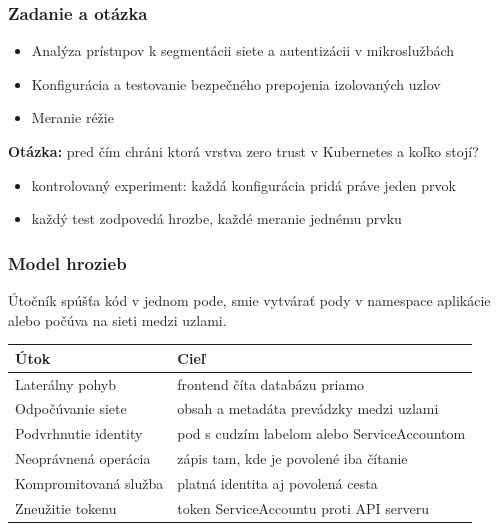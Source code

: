 \documentclass[%
  12pt,       				%
	t,                  %
	aspectratio=1610,   %
	unicode,						%
]{beamer}				    	%
\begin{document}
\disablenavigationsymbols

\maketitle


\begin{frame}
  \frametitle{Zadanie a otázka}
  \begin{itemize}
    \item Analýza prístupov k segmentácii siete a autentizácii v mikroslužbách
    \item Konfigurácia a testovanie bezpečného prepojenia izolovaných uzlov
    \item Meranie réžie
  \end{itemize}
  \vspace{1em}
  \textbf{Otázka:} pred čím chráni ktorá vrstva zero trust v Kubernetes a koľko stojí?
  \vspace{1em}
  \begin{itemize}
    \item kontrolovaný experiment: každá konfigurácia pridá práve jeden prvok
    \item každý test zodpovedá hrozbe, každé meranie jednému prvku
  \end{itemize}
\end{frame}

\begin{frame}
  \frametitle{Model hrozieb}
  Útočník spúšťa kód v jednom pode, smie vytvárať pody v namespace aplikácie alebo počúva na sieti medzi uzlami.
  \vspace{0.5em}
  \small
  \begin{tabular}{@{}ll@{}}
    \toprule
    Útok & Cieľ \\
    \midrule
    Laterálny pohyb & frontend číta databázu priamo \\
    Odpočúvanie siete & obsah a metadáta prevádzky medzi uzlami \\
    Podvrhnutie identity & pod s cudzím labelom alebo ServiceAccountom \\
    Neoprávnená operácia & zápis tam, kde je povolené iba čítanie \\
    Kompromitovaná služba & platná identita aj povolená cesta \\
    Zneužitie tokenu & token ServiceAccountu proti API serveru \\
    \bottomrule
  \end{tabular}
\end{frame}
\end{document}
